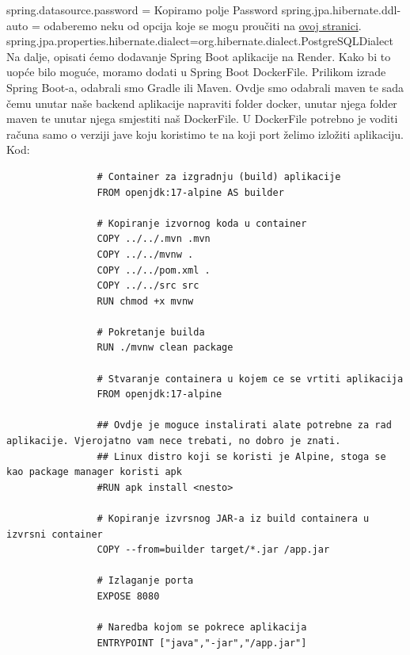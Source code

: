 			spring.datasource.password = Kopiramo polje Password \newline
			spring.jpa.hibernate.ddl-auto = odaberemo neku od opcija koje se mogu proučiti na
			\href{https://www.jobyme88.com/?st_ai=spring-jpa-hibernate-ddl-auto}{ovoj stranici}.\newline
			spring.jpa.properties.hibernate.dialect=org.hibernate.dialect.PostgreSQLDialect
			\bigbreak
			\noindent Na dalje, opisati ćemo dodavanje Spring Boot aplikacije na Render. Kako bi to uopće bilo moguće, moramo dodati u Spring Boot DockerFile. Prilikom izrade Spring Boot-a, odabrali smo Gradle ili Maven. Ovdje smo odabrali maven te sada čemu unutar naše backend aplikacije napraviti folder docker, unutar njega folder maven te unutar njega smjestiti naš DockerFile. U DockerFile potrebno je voditi računa samo o verziji jave koju koristimo te na koji port želimo izložiti aplikaciju.
			\bigbreak
			\noindent Kod:
			\bigbreak
			\begin{verbatim}
				# Container za izgradnju (build) aplikacije
				FROM openjdk:17-alpine AS builder
				
				# Kopiranje izvornog koda u container
				COPY ../../.mvn .mvn
				COPY ../../mvnw .
				COPY ../../pom.xml .
				COPY ../../src src
				RUN chmod +x mvnw
				
				# Pokretanje builda
				RUN ./mvnw clean package
				
				# Stvaranje containera u kojem ce se vrtiti aplikacija
				FROM openjdk:17-alpine
				
				## Ovdje je moguce instalirati alate potrebne za rad aplikacije. Vjerojatno vam nece trebati, no dobro je znati.
				## Linux distro koji se koristi je Alpine, stoga se kao package manager koristi apk
				#RUN apk install <nesto>
				
				# Kopiranje izvrsnog JAR-a iz build containera u izvrsni container
				COPY --from=builder target/*.jar /app.jar
				
				# Izlaganje porta
				EXPOSE 8080
				
				# Naredba kojom se pokrece aplikacija
				ENTRYPOINT ["java","-jar","/app.jar"]
				
			\end{verbatim}
			

